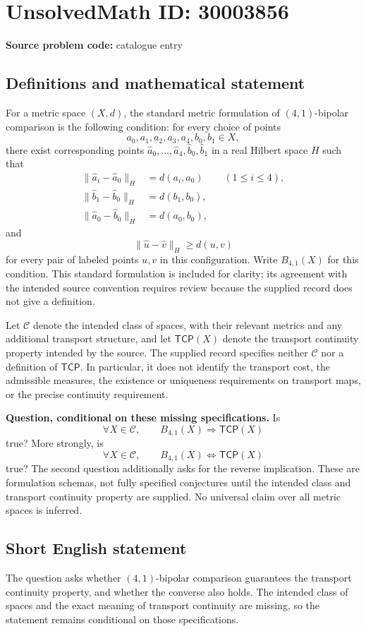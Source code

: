 \documentclass[11pt]{article}
\begin{document}
\section*{UnsolvedMath ID: 30003856}
\textbf{Source problem code:} catalogue entry
\subsection{Definitions and mathematical statement}
For a metric space $(X,d)$, the standard metric formulation of $(4,1)$-bipolar comparison is the following condition: for every choice of points
\[
a_0,a_1,a_2,a_3,a_4,b_0,b_1\in X,
\]
there exist corresponding points $\widehat a_0,\ldots,\widehat a_4,\widehat b_0,\widehat b_1$ in a real Hilbert space $H$ such that
\[
\begin{aligned}
\|\widehat a_i-\widehat a_0\|_H&=d(a_i,a_0) &&(1\leq i\leq4),\\
\|\widehat b_1-\widehat b_0\|_H&=d(b_1,b_0),\\
\|\widehat a_0-\widehat b_0\|_H&=d(a_0,b_0),
\end{aligned}
\]
and
\[
\|\widehat u-\widehat v\|_H\geq d(u,v)
\]
for every pair of labeled points $u,v$ in this configuration. Write $B_{4,1}(X)$ for this condition. This standard formulation is included for clarity; its agreement with the intended source convention requires review because the supplied record does not give a definition.

Let $\mathcal C$ denote the intended class of spaces, with their relevant metrics and any additional transport structure, and let $\mathsf{TCP}(X)$ denote the transport continuity property intended by the source. The supplied record specifies neither $\mathcal C$ nor a definition of $\mathsf{TCP}$. In particular, it does not identify the transport cost, the admissible measures, the existence or uniqueness requirements on transport maps, or the precise continuity requirement.

\textbf{Question, conditional on these missing specifications.} Is
\[
\forall X\in\mathcal C,\qquad B_{4,1}(X)\Longrightarrow\mathsf{TCP}(X)
\]
true? More strongly, is
\[
\forall X\in\mathcal C,\qquad B_{4,1}(X)\Longleftrightarrow\mathsf{TCP}(X)
\]
true? The second question additionally asks for the reverse implication. These are formulation schemas, not fully specified conjectures until the intended class and transport continuity property are supplied. No universal claim over all metric spaces is inferred.
\subsection{Short English statement}
The question asks whether $(4,1)$-bipolar comparison guarantees the transport continuity property, and whether the converse also holds. The intended class of spaces and the exact meaning of transport continuity are missing, so the statement remains conditional on those specifications.
\end{document}
